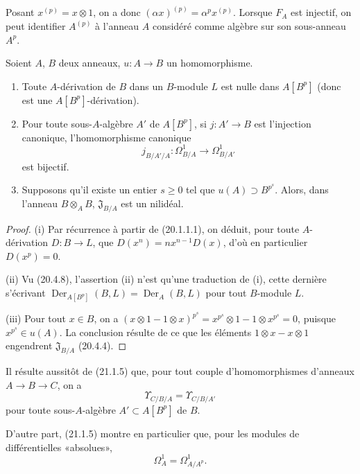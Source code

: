 Posant $x^{(p)}=x\otimes1$, on a donc $(\alpha x)^{(p)}=\alpha^p x^{(p)}$.
Lorsque $F_A$ est injectif, on peut identifier $A^{(p)}$ à l'anneau $A$
considéré comme algèbre sur son sous-anneau $A^p$.

\begin{proposition}[21.1.5]
\label{0.21.1.5-fr}
Soient $A$, $B$ deux anneaux, $u:A\to B$ un homomorphisme.
\begin{enumerate}
  \item[(i)] Toute $A$-dérivation de $B$ dans un $B$-module $L$ est nulle
  dans $A[B^p]$ (donc est une $A[B^p]$-dérivation).
  \item[(ii)] Pour toute sous-$A$-algèbre $A'$ de $A[B^p]$, si
  $j:A'\to B$ est l'injection canonique, l'homomorphisme canonique
  \[
  j_{B/A'/A}:\Omega^1_{B/A}\longrightarrow\Omega^1_{B/A'}
  \]
  est bijectif.
  \item[(iii)] Supposons qu'il existe un entier $s\geq0$ tel que
  $u(A)\supset B^{p^s}$. Alors, dans l'anneau $B\otimes_A B$,
  $\mathfrak J_{B/A}$ est un nilidéal.
\end{enumerate}
\end{proposition}

\begin{proof}
(i) Par récurrence à partir de (20.1.1.1), on déduit, pour toute
$A$-dérivation $D:B\to L$, que $D(x^n)=nx^{n-1}D(x)$, d'où en particulier
$D(x^p)=0$.

(ii) Vu (20.4.8), l'assertion (ii) n'est qu'une traduction de (i), cette
dernière s'écrivant $\operatorname{Der}_{A[B^p]}(B,L)=\operatorname{Der}_A(B,L)$
pour tout $B$-module $L$.

(iii) Pour tout $x\in B$, on a
$(x\otimes1-1\otimes x)^{p^s}=x^{p^s}\otimes1-1\otimes x^{p^s}=0$,
puisque $x^{p^s}\in u(A)$. La conclusion résulte de ce que les éléments
$1\otimes x-x\otimes1$ engendrent $\mathfrak J_{B/A}$ (20.4.4).
\end{proof}

Il résulte aussitôt de (21.1.5) que, pour tout couple d'homomorphismes
d'anneaux $A\to B\to C$, on a
\begin{equation}
\tag{21.1.5.1}
\label{0.21.1.5.1-fr}
\Upsilon_{C/B/A}=\Upsilon_{C/B/A'}
\end{equation}
pour toute sous-$A$-algèbre $A'\subset A[B^p]$ de $B$.

D'autre part, (21.1.5) montre en particulier que, pour les modules de
différentielles «absolues»,
\begin{equation}
\tag{21.1.5.2}
\label{0.21.1.5.2-fr}
\Omega^1_A=\Omega^1_{A/A^p}.
\end{equation}

